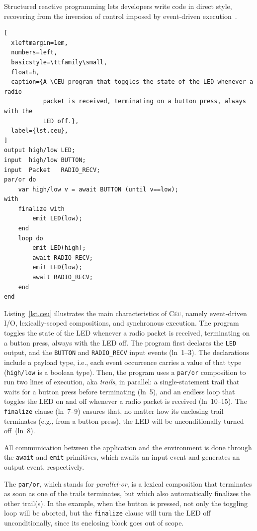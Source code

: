 \documentclass[sigplan,10pt,review,anonymous]{acmart}\settopmatter{printfolios=true,printccs=false,printacmref=false}
\newcommand{\CEU}{\textsc{C\'{e}u}\xspace}
\newcommand{\code}[1] {{\small{\texttt{#1}}}}
\begin{document}
Structured reactive programming lets developers write code in direct style,
recovering from the inversion of control imposed by event-driven
execution~\cite{rp.deprecating,rp.rescala,sync_async.cooperative}.

\begin{lstlisting}[
  xleftmargin=1em,
  numbers=left,
  basicstyle=\ttfamily\small,
  float=h,
  caption={A \CEU program that toggles the state of the LED whenever a radio
           packet is received, terminating on a button press, always with the
           LED off.},
  label={lst.ceu},
]
output high/low LED;
input  high/low BUTTON;
input  Packet   RADIO_RECV;
par/or do
    var high/low v = await BUTTON (until v==low);
with
    finalize with
        emit LED(low);
    end
    loop do
        emit LED(high);
        await RADIO_RECV;
        emit LED(low);
        await RADIO_RECV;
    end
end
\end{lstlisting}

Listing~\ref{lst.ceu} illustrates the main characteristics of \CEU, namely
event-driven I/O, lexically-scoped compositions, and synchronous execution.
%
The program toggles the state of the LED whenever a radio packet is received,
terminating on a button press, always with the LED off.
%
The program first declares the \code{LED} output, and the \code{BUTTON} and
\code{RADIO\_RECV} input events (ln~1--3).
The declarations include a payload type, i.e., each event occurrence carries
a value of that type (\code{high/low} is a boolean type).
%
Then, the program uses a \code{par/or} composition to run two lines of
execution, aka \emph{trails}, in parallel:
a single-statement trail that waits for a button press before terminating
(ln~5), and an endless loop that toggles the LED on and off whenever a radio
packet is received (ln~10--15).
The \code{finalize} clause (ln~7--9) ensures that, no matter how its enclosing
trail terminates (e.g., from a button press), the LED will be unconditionally
turned off~(ln~8).

All communication between the application and the environment is done through
the \code{await} and \code{emit} primitives, which awaits an input event and
generates an output event, respectively.

The \code{par/or}, which stands for \emph{parallel-or}, is a lexical
composition that terminates as soon as one of the trails terminates, but which
also automatically finalizes the other trail(s).
%
In the example, when the button is pressed, not only the toggling loop will be
aborted, but the \code{finalize} clause will turn the LED off unconditionally,
since its enclosing block goes out of scope.
\end{document}
